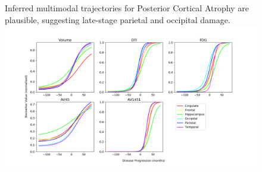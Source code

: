 \documentclass[portrait,a0,final,20pt]{a0poster}
\newcommand{\fnt}[1]{\LARGE{#1}}
\begin{document}
{\begin{multicols}{2}
\begin{figure}[H]
\fnt{Inferred multimodal trajectories for Posterior Cortical Atrophy are plausible, suggesting late-stage parietal and occipital damage. }
 \includegraphics[width=\columnwidth, trim=0 20 0 35, clip]{../figures/trajDisSpaceOverlap_PCA_tad-drcTinyPen5_JMD.png}
\end{figure}



\end{multicols}}
\end{document}
